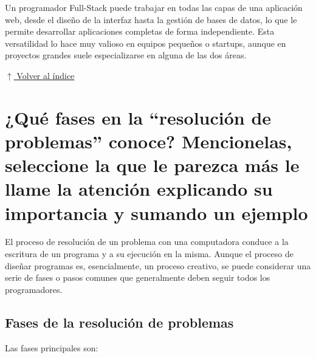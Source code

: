 \documentclass[12pt]{article}
\newcommand{\volverindice}{%
    \vspace{1em}%
    \begin{flushright}%
        \hyperlink{indice}{\small $\uparrow$ Volver al índice}%
    \end{flushright}%
}
\begin{document}
Un programador Full-Stack puede trabajar en todas las capas de una aplicación web, desde el diseño de la interfaz hasta la gestión de bases de datos, lo que le permite desarrollar aplicaciones completas de forma independiente. Esta versatilidad lo hace muy valioso en equipos pequeños o startups, aunque en proyectos grandes suele especializarse en alguna de las dos áreas.

\volverindice
\newpage


\section{¿Qué fases en la ``resolución de problemas'' conoce? Mencionelas, seleccione la que le parezca más le llame la atención explicando su importancia y sumando un ejemplo}

El proceso de resolución de un problema con una computadora conduce a la escritura de un programa y a su ejecución en la misma. Aunque el proceso de diseñar programas es, esencialmente, un proceso creativo, se puede considerar una serie de fases o pasos comunes que generalmente deben seguir todos los programadores.

\subsection{Fases de la resolución de problemas}

Las fases principales son:
\end{document}
